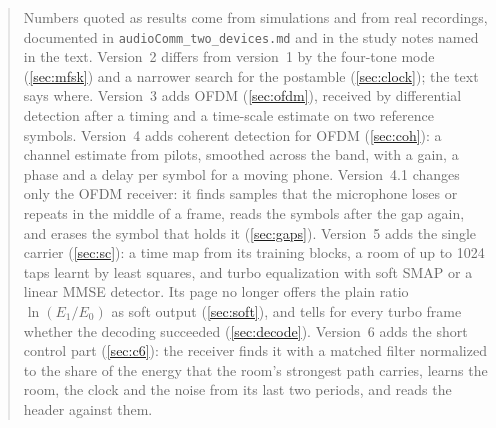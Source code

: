 \documentclass[11pt,a4paper]{article}
\newcommand{\code}[1]{\texttt{#1}}
\theoremstyle{remark}
\begin{document}
\begin{abstract}
Numbers quoted as results come from simulations and from real recordings, documented in \code{audioComm\_two\_devices.md} and in the study notes named in the text.
Version~2 differs from version~1 by the four-tone mode (\cref{sec:mfsk}) and a narrower search for the postamble (\cref{sec:clock}); the text says where.
Version~3 adds OFDM (\cref{sec:ofdm}), received by differential detection after a timing and a time-scale estimate on two reference symbols.
Version~4 adds coherent detection for OFDM (\cref{sec:coh}): a channel estimate from pilots, smoothed across the band, with a gain, a phase and a delay per symbol for a moving phone.
Version~4.1 changes only the OFDM receiver: it finds samples that the microphone loses or repeats in the middle of a frame, reads the symbols after the gap again, and erases the symbol that holds it (\cref{sec:gaps}).
Version~5 adds the single carrier (\cref{sec:sc}): a time map from its training blocks, a room of up to 1024 taps learnt by least squares, and turbo equalization with soft SMAP or a linear MMSE detector. Its page no longer offers the plain ratio $\ln(E_1/E_0)$ as soft output (\cref{sec:soft}), and tells for every turbo frame whether the decoding succeeded (\cref{sec:decode}).
Version~6 adds the short control part (\cref{sec:c6}): the receiver finds it with a matched filter normalized to the share of the energy that the room's strongest path carries, learns the room, the clock and the noise from its last two periods, and reads the header against them.

\end{abstract}
\end{document}
